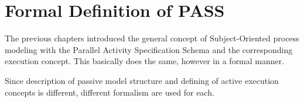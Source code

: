 \chapter{Formal Definition of PASS}
\label{sec:FormalDefintions}

The previous chapters introduced the general concept of Subject-Oriented process modeling with the Parallel Activity Specification Schema and the corresponding execution concept. This basically does the same, however in a formal manner. 

Since description of passive model structure and defining of active execution concepts is different, different formalism are used for each. 




